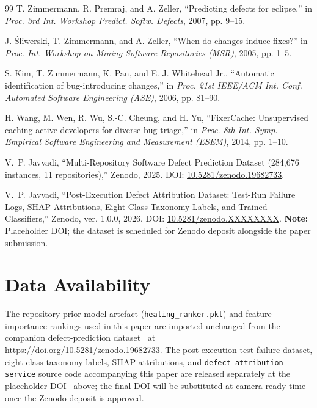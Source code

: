 \documentclass[conference]{IEEEtran}
\begin{document}
\begin{thebibliography}{99}
 T. Zimmermann, R. Premraj, and A. Zeller, ``Predicting defects for eclipse,'' in \textit{Proc. 3rd Int. Workshop Predict. Softw. Defects}, 2007, pp. 9--15.

 J. \'Sliwerski, T. Zimmermann, and A. Zeller, ``When do changes induce fixes?'' in \textit{Proc. Int. Workshop on Mining Software Repositories (MSR)}, 2005, pp. 1--5.

 S. Kim, T. Zimmermann, K. Pan, and E. J. Whitehead Jr., ``Automatic identification of bug-introducing changes,'' in \textit{Proc. 21st IEEE/ACM Int. Conf. Automated Software Engineering (ASE)}, 2006, pp. 81--90.

 H. Wang, M. Wen, R. Wu, S.-C. Cheung, and H. Yu, ``FixerCache: Unsupervised caching active developers for diverse bug triage,'' in \textit{Proc. 8th Int. Symp. Empirical Software Engineering and Measurement (ESEM)}, 2014, pp. 1--10.

 V.~P. Javvadi, ``Multi-Repository Software Defect Prediction Dataset (284,676 instances, 11 repositories),'' Zenodo, 2025. DOI: \href{https://doi.org/10.5281/zenodo.19682733}{10.5281/zenodo.19682733}.

 V.~P. Javvadi, ``Post-Execution Defect Attribution Dataset: Test-Run Failure Logs, SHAP Attributions, Eight-Class Taxonomy Labels, and Trained Classifiers,'' Zenodo, ver. 1.0.0, 2026. DOI: \href{https://doi.org/10.5281/zenodo.XXXXXXXX}{10.5281/zenodo.XXXXXXXX}. \textbf{Note:} Placeholder DOI; the dataset is scheduled for Zenodo deposit alongside the paper submission.

\end{thebibliography}

\section*{Data Availability}
The repository-prior model artefact (\texttt{healing\_ranker.pkl}) and feature-importance rankings used in this paper are imported unchanged from the companion defect-prediction dataset~\cite{javvadi2025defect_dataset} at \url{https://doi.org/10.5281/zenodo.19682733}. The post-execution test-failure dataset, eight-class taxonomy labels, SHAP attributions, and \texttt{defect-attribution-service} source code accompanying this paper are released separately at the placeholder DOI~\cite{javvadi2026attribution_dataset} above; the final DOI will be substituted at camera-ready time once the Zenodo deposit is approved.
\end{document}
